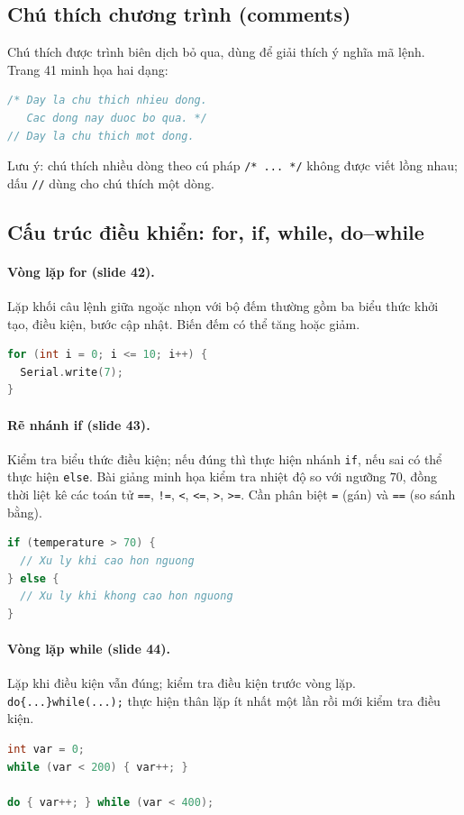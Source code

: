 \subsection{Chú thích chương trình (comments)}
Chú thích được trình biên dịch bỏ qua, dùng để giải thích ý nghĩa mã lệnh. Trang 41 minh họa hai dạng:
\begin{lstlisting}[language=C++]
/* Day la chu thich nhieu dong.
   Cac dong nay duoc bo qua. */
// Day la chu thich mot dong.
\end{lstlisting}
\noindent Lưu ý: chú thích nhiều dòng theo cú pháp \texttt{/* ... */} không được viết lồng nhau; dấu \texttt{//} dùng cho chú thích một dòng.
\subsection{Cấu trúc điều khiển: for, if, while, do--while}
\paragraph{Vòng lặp for (slide 42).} Lặp khối câu lệnh giữa ngoặc nhọn với bộ đếm thường gồm ba biểu thức khởi tạo, điều kiện, bước cập nhật. Biến đếm có thể tăng hoặc giảm.
\begin{lstlisting}[language=C++]
for (int i = 0; i <= 10; i++) {
  Serial.write(7);
}
\end{lstlisting}
\paragraph{Rẽ nhánh if (slide 43).} Kiểm tra biểu thức điều kiện; nếu đúng thì thực hiện nhánh \texttt{if}, nếu sai có thể thực hiện \texttt{else}. Bài giảng minh họa kiểm tra nhiệt độ so với ngưỡng \(70\), đồng thời liệt kê các toán tử \texttt{==}, \texttt{!=}, \texttt{<}, \texttt{<=}, \texttt{>}, \texttt{>=}. Cần phân biệt \texttt{=} (gán) và \texttt{==} (so sánh bằng).
\begin{lstlisting}[language=C++]
if (temperature > 70) {
  // Xu ly khi cao hon nguong
} else {
  // Xu ly khi khong cao hon nguong
}
\end{lstlisting}
\paragraph{Vòng lặp while (slide 44).} Lặp khi điều kiện vẫn đúng; kiểm tra điều kiện trước vòng lặp. \texttt{do\{...\}while(...);} thực hiện thân lặp ít nhất một lần rồi mới kiểm tra điều kiện.
\begin{lstlisting}[language=C++]
int var = 0;
while (var < 200) { var++; }

do { var++; } while (var < 400);
\end{lstlisting}
